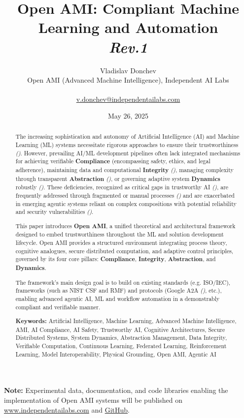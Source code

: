 \documentclass[12pt,a4paper]{report}
\title{{\LARGE Open AMI: \LARGE Compliant Machine Learning and Automation\\\textit{\normalsize{Rev.1}}}}
\author{Vladislav Donchev\\Open AMI (Advanced Machine Intelligence), Independent AI Labs\\ \\\normalsize{\href{mailto:v.donchev@independentailabs.com}{v.donchev@independentailabs.com}}}
\date{May 26, 2025}
\renewcommand{\citep}[1]{\textit{\scriptsize{(\cite{#1})}}}
\newcommand{\Compliance}{\textbf{Compliance}}
\newcommand{\Integrity}{\textbf{Integrity}}
\newcommand{\Abstraction}{\textbf{Abstraction}}
\newcommand{\Dynamics}{\textbf{Dynamics}}
\begin{document}
	\begin{titlepage}
		\maketitle
		\vspace{2cm}
		\begin{abstract}
			The increasing sophistication and autonomy of Artificial Intelligence (AI) and Machine Learning (ML) systems necessitate rigorous approaches to ensure their trustworthiness \citep{Li2021}. However, prevailing AI/ML development pipelines often lack integrated mechanisms for achieving verifiable \textbf{Compliance} (encompassing safety, ethics, and legal adherence), maintaining data and computational \textbf{Integrity} \citep{Balan2025}, managing complexity through transparent \textbf{Abstraction} \citep{Spoczynski2025}, or governing adaptive system \textbf{Dynamics} robustly \citep{AdditionalCitationRef2, Hinder2024}. These deficiencies, recognized as critical gaps in trustworthy AI \citep{AdditionalCitationRef1}, are frequently addressed through fragmented or manual processes \citep{AdditionalCitationRef2} and are exacerbated in emerging agentic systems reliant on complex compositions with potential reliability and security vulnerabilities \citep{Schneider2024, Narajala2025}.
			
			This paper introduces \textbf{Open AMI}, a unified theoretical and architectural framework designed to embed trustworthiness throughout the ML and solution development lifecycle. Open AMI provides a structured environment integrating process theory, cognitive analogues, secure distributed computation, and adaptive control principles, governed by its four core pillars: \Compliance, \Integrity, \Abstraction, and \Dynamics.
			
			The framework's main design goal is to build on existing standards (e.g. ISO/IEC), frameworks (such as NIST CSF and RMF) and protocols (Google A2A \citep{A2A_README}, etc.), enabling advanced agentic AI, ML and workflow automation in a demonstrably compliant and verifiable manner.
			
			\vspace{0.5cm} %
			\textbf{Keywords:} Artificial Intelligence, Machine Learning, Advanced Machine Intelligence, AMI, AI Compliance, AI Safety, Trustworthy AI, Cognitive Architectures, Secure Distributed Systems, System Dynamics, Abstraction Management, Data Integrity, Verifiable Computation, Continuous Learning, Federated Learning, Reinforcement Learning, Model Interoperability, Physical Grounding, Open AMI, Agentic AI
		\end{abstract}
		\vfill
		\begin{center}
			\textbf{Note:} Experimental data, documentation, and code libraries enabling the implementation of Open AMI systems will be published on \href{https://www.independentailabs.com}{www.independentailabs.com} and \href{https://github.com/Independent-AI-Labs/OpenAMI}{GitHub}.

\end{center}
\end{titlepage}
\end{document}
